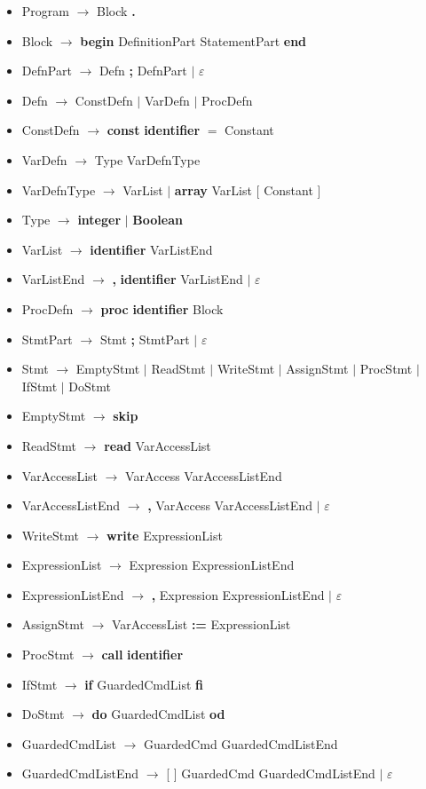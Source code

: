 \documentclass{article}
\let\bf\textbf
\newcommand{\der}{$\longrightarrow$ }
\newcommand{\es}{$\varepsilon$ }
\newcommand{\alt}{\Large$|$ \normalsize }
\begin{document}
\begin{itemize}[label={}]
    \itemsep-0.3em
    \item Program \der Block \bf .
    \item Block \der \bf{begin} DefinitionPart StatementPart \bf{end}
    \item DefnPart \der Defn \bf ; DefnPart \alt \es
    \item Defn \der ConstDefn \alt VarDefn \alt ProcDefn
    \item ConstDefn \der \bf{const} \bf{identifier} $=$ Constant
    \item VarDefn \der Type VarDefnType
    \item VarDefnType \der VarList \alt \bf{array} VarList [ Constant ]
    \item Type \der \bf{integer} \alt \bf {Boolean}
    \item VarList \der \bf{identifier} VarListEnd
    \item VarListEnd \der \bf, \bf{identifier} VarListEnd \alt \es
    \item ProcDefn \der \bf{proc} \bf{identifier} Block
    \item StmtPart \der Stmt \bf ; StmtPart \alt \es
    \item Stmt \der EmptyStmt \alt ReadStmt \alt WriteStmt \alt AssignStmt \alt ProcStmt \alt IfStmt \alt DoStmt
    \item EmptyStmt \der \bf{skip}
    \item ReadStmt \der \bf{read} VarAccessList
    \item VarAccessList \der VarAccess VarAccessListEnd
    \item VarAccessListEnd \der \bf , VarAccess VarAccessListEnd \alt \es
    \item WriteStmt \der \bf{write} ExpressionList
    \item ExpressionList \der Expression ExpressionListEnd
    \item ExpressionListEnd \der \bf, Expression ExpressionListEnd \alt \es 
    \item AssignStmt \der VarAccessList \bf{:=} ExpressionList
    \item ProcStmt \der \bf{call} \bf{identifier}
    \item IfStmt \der \bf{if} GuardedCmdList \bf{fi}
    \item DoStmt \der \bf{do} GuardedCmdList \bf{od}
    \item GuardedCmdList \der GuardedCmd GuardedCmdListEnd
    \item GuardedCmdListEnd \der [ ] GuardedCmd GuardedCmdListEnd \alt \es

\end{itemize}
\end{document}
